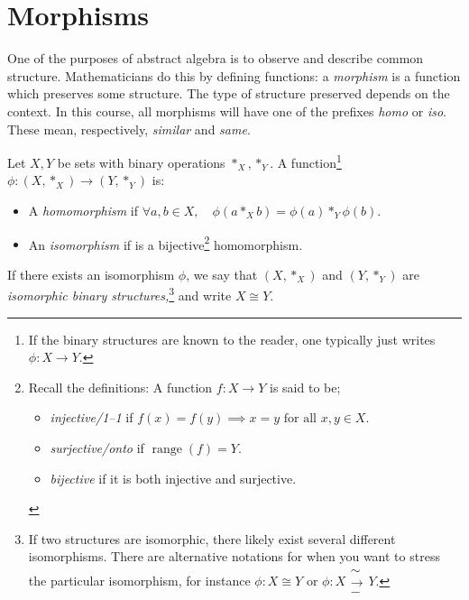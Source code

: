 \section{Morphisms}\label{sec:morph}

One of the purposes of abstract algebra is to observe and describe common structure. Mathematicians do this by defining functions: a \emph{morphism} is a function which preserves some structure. The type of structure preserved depends on the context. In this course, all morphisms will have one of the prefixes \emph{homo} or \emph{iso}. These mean, respectively, \emph{similar} and \emph{same}.

\begin{defn}\label{defn:homo}
Let $X,Y$ be sets with binary operations $*_X,*_Y$. A function\footnote{If the binary structures are known to the reader, one typically just writes $\phi:X\to Y$.} $\phi:(X,*_X)\to(Y,*_Y)$ is:
\begin{itemize}
  \item A \emph{homomorphism} if $\displaystyle\forall a,b\in X,\quad \phi(a*_Xb)=\phi(a)*_Y\phi(b)$.
  \item An \emph{isomorphism} if is a bijective\footnote{Recall the definitions: A function $f:X\to Y$ is said to be;
	\begin{itemize}
		\item \emph{injective/1--1} if $f(x)=f(y)\implies x=y\text{ for all }x,y\in X$.
		\item \emph{surjective/onto} if $\operatorname{range}(f)=Y$.
		\item \emph{bijective} if it is both injective and surjective.
	\end{itemize}} homomorphism.
\end{itemize}
If there exists an isomorphism $\phi$, we say that $(X,*_X)$ and $(Y,*_Y)$ are \emph{isomorphic binary structures,}\footnote{If two structures are isomorphic, there likely exist several different isomorphisms. There are alternative notations for when you want to stress the particular isomorphism, for instance $\phi:X\cong Y$ or $\phi:X\!\! \begin{array}{c} \sim\\[-2ex]\longrightarrow\\[-2ex]- \end{array} \!\!Y$.} and write $X\cong Y$.
\end{defn}




